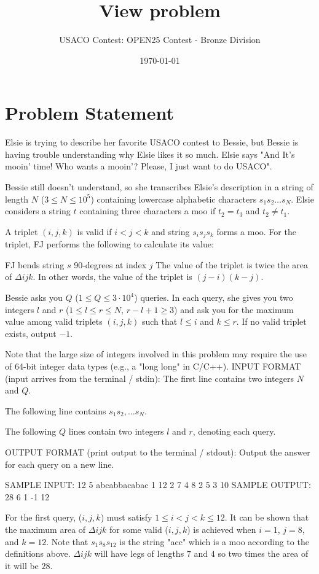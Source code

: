 \documentclass[12pt]{article}
\title{View problem}
\author{USACO Contest: OPEN25 Contest - Bronze Division}
\date{\today}
\begin{document}
\maketitle

\section*{Problem Statement}


Elsie is trying to describe her favorite USACO contest to Bessie, but Bessie is
having trouble understanding why Elsie likes it so much. Elsie says "And It's
mooin' time! Who wants a mooin'? Please, I just want to do USACO". 

Bessie still doesn't understand, so she transcribes Elsie's description in a
string of length $N$ ($3 \leq N \leq 10^5$)  containing lowercase alphabetic
characters $s_1s_2 \ldots s_N$.  Elsie considers a string $t$ containing three
characters a moo if $t_2 = t_3$ and $t_2 \neq t_1$.

A triplet $(i, j, k)$ is valid if $i < j < k$ and string $s_i s_j s_k$ forms a
moo. For the triplet, FJ performs the following to calculate its value:

 FJ bends string $s$ 90-degrees at index $j$  The value of the
triplet is twice the area of $\Delta ijk$. 
In other words, the value of the triplet is $(j-i)(k-j)$.

Bessie asks you $Q$ ($1 \leq Q \leq 3 \cdot 10^4$) queries. In each query, she
gives you two integers $l$ and $r$ ($1 \leq l \leq r \leq N$, $r-l+1 \ge 3$) and
ask you for the maximum value among valid triplets $(i, j, k)$ such that
$l \leq i$ and $k \leq r$. If no valid triplet exists, output $-1$.  

Note that the large size of integers involved in this problem may require the
use of 64-bit integer data types (e.g., a "long long" in C/C++).
INPUT FORMAT (input arrives from the terminal / stdin):
The first line contains two integers $N$ and $Q$. 

The following line contains $s_1 s_2, \ldots s_N$.

The following $Q$ lines contain two integers $l$ and $r$, denoting each query.

OUTPUT FORMAT (print output to the terminal / stdout):
Output the answer for each query on a new line.

SAMPLE INPUT:
12 5
abcabbacabac
1 12
2 7
4 8
2 5
3 10
SAMPLE OUTPUT: 
28
6
1
-1
12

For the first query, ($i,j,k$) must satisfy $1 \le i < j < k \le 12$. It can be
shown that the maximum area of $\Delta ijk$ for some valid ($i,j,k$) is achieved
when $i=1$, $j=8$, and $k=12$. Note that $s_1 s_8 s_{12}$ is the string "acc"
which is  a moo according to the definitions above. $\Delta ijk$ will have legs
of lengths $7$ and $4$ so two times the area of it will be $28$. 
\end{document}
